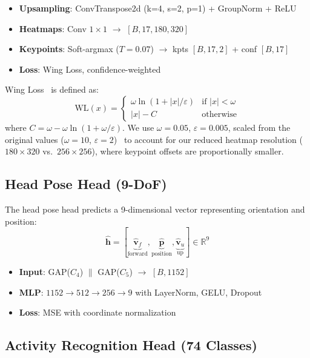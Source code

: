\documentclass[10pt,twocolumn]{article}
\begin{document}
\begin{itemize}[nosep]
\item \textbf{Upsampling}: ConvTranspose2d (k=4, s=2, p=1) + GroupNorm + ReLU
\item \textbf{Heatmaps}: Conv $1\times1$ $\rightarrow$ $[B, 17, 180, 320]$
\item \textbf{Keypoints}: Soft-argmax ($T=0.07$) $\rightarrow$ kpts $[B, 17, 2]$ + conf $[B, 17]$
\item \textbf{Loss}: Wing Loss, confidence-weighted
\end{itemize}

Wing Loss~\cite{feng2021wing} is defined as:
\begin{equation}
\text{WL}(x) = \begin{cases}
\omega \ln(1 + |x|/\varepsilon) & \text{if } |x| < \omega \\
|x| - C & \text{otherwise}
\end{cases}
\end{equation}
where $C = \omega - \omega\ln(1 + \omega/\varepsilon)$. We use $\omega=0.05$, $\varepsilon=0.005$, scaled from the original values ($\omega=10$, $\varepsilon=2$)~\cite{feng2021wing} to account for our reduced heatmap resolution ($180\times320$ vs.\ $256\times256$), where keypoint offsets are proportionally smaller.

\subsection{Head Pose Head (9-DoF)}

The head pose head predicts a 9-dimensional vector representing orientation and position:
\begin{equation}
\hat{\mathbf{h}} = [\underbrace{\hat{\mathbf{v}}_f}_{\text{forward}}, \underbrace{\hat{\mathbf{p}}}_{\text{position}}, \underbrace{\hat{\mathbf{v}}_u}_{\text{up}}] \in \mathbb{R}^{9}
\end{equation}
\begin{itemize}[nosep]
\item \textbf{Input}: GAP($C_4$) $\|$ GAP($C_5$) $\rightarrow$ $[B, 1152]$
\item \textbf{MLP}: $1152 \rightarrow 512 \rightarrow 256 \rightarrow 9$ with LayerNorm, GELU, Dropout
\item \textbf{Loss}: MSE with coordinate normalization
\end{itemize}

\subsection{Activity Recognition Head (74 Classes)}
\label{sec:activity-head}
\end{document}
